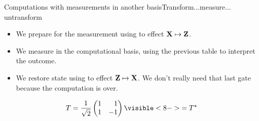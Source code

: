 \begin{frame}{Computations with measurements in another basis}{Transform$\ldots$measure$\ldots$untransform}
{{{\begin{itemize}
    \item<17-> We prepare for the measurement using  to effect $\mbox{\bfseries{\textrm{X}}}\mapsto\mbox{\bfseries{\textrm{Z}}}$.
    \item<18-> We measure in the computational basis, using the previous table to interpret the outcome.
    \item<19-> We restore state using  to effect $\mbox{\bfseries{\textrm{Z}}}\mapsto\mbox{\bfseries{\textrm{X}}}$. We don't really need that last gate because the computation is over.
\end{itemize}
}
}{%
\[T = \HMatrix \visible<8->{=\Conj{T}}\]
}
}
    
\end{frame}

